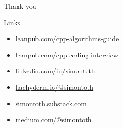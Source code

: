 \documentclass[aspectratio=169]{beamer}
\begin{document}
\begin{frame}[c]
  \begin{center}
    \huge Thank you
  \end{center}
\end{frame}

\begin{frame}{Links}
  \begin{itemize}
    \item \href{https://leanpub.com/cpp-algorithms-guide}{leanpub.com/cpp-algorithms-guide}
    \item \href{https://leanpub.com/cpp-coding-interview}{leanpub.com/cpp-coding-interview}
    \item \href{https://www.linkedin.com/in/simontoth}{linkedin.com/in/simontoth}
    \item \href{https://hachyderm.io/@simontoth}{hachyderm.io/@simontoth}
    \item \href{https://simontoth.substack.com/}{simontoth.substack.com}
    \item \href{https://medium.com/@simontoth}{medium.com/@simontoth}
  \end{itemize}
\end{frame}
\end{document}
